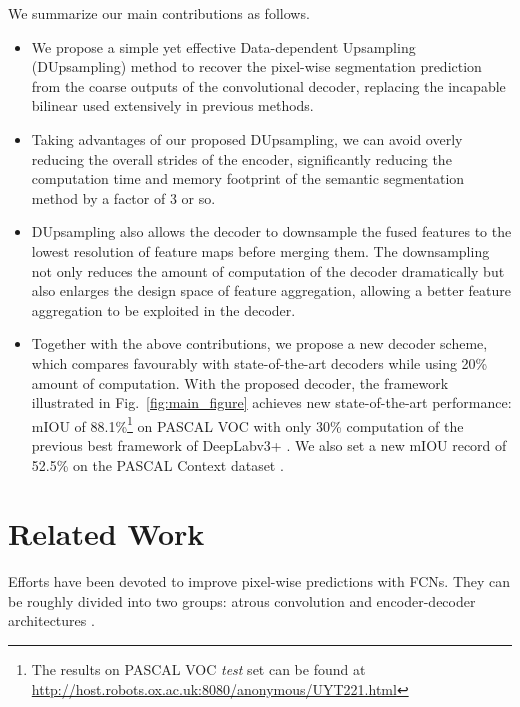 \documentclass[10pt,twocolumn,letterpaper]{article}
\newcommand{\1}{{\mathbbm{1}}}
\begin{document}
We summarize our main contributions as follows.
\begin{itemize}
\itemsep -.05112cm
    \item We propose a simple yet effective Data-dependent Upsampling (DUpsampling) method to recover the pixel-wise segmentation prediction from the coarse outputs of the convolutional decoder,
replacing the incapable bilinear used extensively in previous methods.
    \item Taking advantages of our proposed DUpsampling, we can avoid overly reducing the overall strides of the encoder, significantly reducing the computation time and memory footprint of
    the semantic segmentation method  by a factor of 3 or so.
    \item DUpsampling also allows the decoder to downsample the fused features to the lowest resolution of feature maps before merging them. The downsampling not only reduces the amount of computation of the decoder dramatically but also enlarges the design space of feature aggregation, allowing a better feature aggregation to be exploited in the decoder.
    \item Together with the above contributions, we propose a new decoder scheme, which compares favourably with state-of-the-art decoders while using 20\% amount of computation. With the proposed decoder, the framework illustrated in Fig.~\ref{fig:main_figure} achieves new state-of-the-art performance: mIOU of 88.1\%\footnote{The results on PASCAL VOC {\it test} set can be found at \url{http://host.robots.ox.ac.uk:8080/anonymous/UYT221.html}
    } on PASCAL VOC \cite{everingham2010pascal} with only  30\% computation of the previous best
    framework of DeepLabv3+ \cite{chen2018encoder}.
We also set a new mIOU record of 52.5\% on the PASCAL Context dataset
    \cite{mottaghi2014role}.
\end{itemize}

\section{Related Work}

Efforts have been devoted  to improve  pixel-wise predictions with FCNs. They can be roughly divided into two groups:
atrous convolution \cite{chen2018deeplab, yu2015multi} and encoder-decoder architectures \cite{lin2017refinenet, chen2018encoder, long2015fully, badrinarayanan2017segnet, noh2015learning}.
\end{document}
